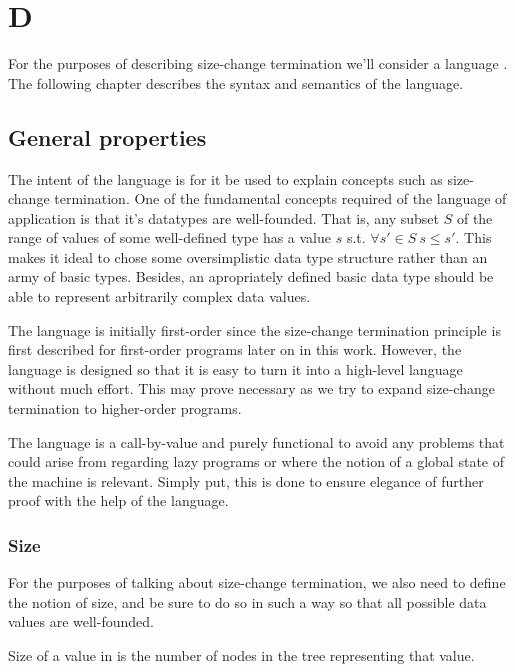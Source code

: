 \newcommand{\D}{D}
\chapter{\D}

For the purposes of describing size-change termination we'll consider a language
. The following chapter describes the syntax and semantics of the
language.

\section{General properties}

The intent of the language is for it be used to explain concepts such as
size-change termination. One of the fundamental concepts required of the
language of application is that it's datatypes are well-founded. That is, any
subset $S$ of the range of values of some well-defined type has a value $s$
s.t. $\forall {s'\in S}\ s\leq s'$. This makes it ideal to chose some
oversimplistic data type structure rather than an army of basic types. Besides,
an apropriately defined basic data type should be able to represent arbitrarily
complex data values.

The language is initially first-order since the size-change termination
principle is first described for first-order programs later on in this work.
However, the language is designed so that it is easy to turn it into a
high-level language without much effort. This may prove necessary as we try to
expand size-change termination to higher-order programs.

The language is a call-by-value and purely functional to avoid any problems
that could arise from regarding lazy programs or where the notion of a global
state of the machine is relevant. Simply put, this is done to ensure elegance
of further proof with the help of the language.







\subsection{Size}

For the purposes of talking about size-change termination, we also need to
define the notion of size, and be sure to do so in such a way so that all
possible data values are well-founded.

\begin{definition}\label{definition:size}

Size of a value in  is the number of nodes in the tree representing
that value.

\end{definition}

